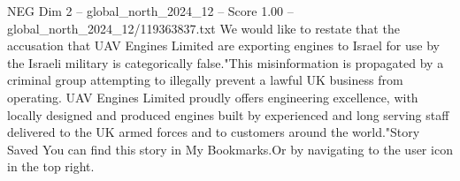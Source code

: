 \begin{textsample}{NEG Dim 2 – global\_north\_2024\_12 – Score 1.00 – global\_north\_2024\_12/119363837.txt}
We would like to restate that the accusation that UAV Engines Limited are exporting engines to Israel for use by the Israeli military is categorically false."This misinformation is propagated by a criminal group attempting to illegally prevent a lawful UK business from operating.
UAV Engines Limited proudly offers engineering excellence, with locally designed and produced engines built by experienced and long serving staff delivered to the UK armed forces and to customers around the world."Story Saved You can find this story in My Bookmarks.Or by navigating to the user icon in the top right.

\end{textsample}
